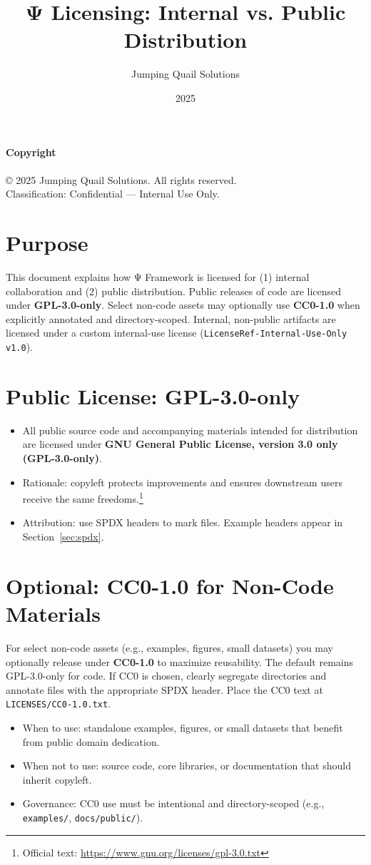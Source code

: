 \documentclass[11pt]{article}
\title{Ψ Licensing: Internal vs. Public Distribution}
\author{Jumping Quail Solutions}
\date{2025}
\newcommand{\proj}{Ψ Framework}
\begin{document}
\maketitle

\noindent\textbf{Copyright} \\[-0.3em]
\\© 2025 Jumping Quail Solutions. All rights reserved.\\
Classification: Confidential — Internal Use Only.\\

\section*{Purpose}
This document explains how \proj{} is licensed for (1) internal collaboration and (2) public distribution. Public releases of code are licensed under \textbf{GPL-3.0-only}. Select non-code assets may optionally use \textbf{CC0-1.0} when explicitly annotated and directory-scoped. Internal, non-public artifacts are licensed under a custom internal-use license (\texttt{LicenseRef-Internal-Use-Only v1.0}).

\section*{Public License: GPL-3.0-only}
\begin{itemize}[leftmargin=*]
  \item All public source code and accompanying materials intended for distribution are licensed under \textbf{GNU General Public License, version 3.0 only (GPL-3.0-only)}.
  \item Rationale: copyleft protects improvements and ensures downstream users receive the same freedoms.\footnote{Official text: \url{https://www.gnu.org/licenses/gpl-3.0.txt}}
  \item Attribution: use SPDX headers to mark files. Example headers appear in Section~\ref{sec:spdx}.
\end{itemize}

\section*{Optional: CC0-1.0 for Non-Code Materials}
For select non-code assets (e.g., examples, figures, small datasets) you may optionally release under \textbf{CC0-1.0} to maximize reusability. The default remains GPL-3.0-only for code. If CC0 is chosen, clearly segregate directories and annotate files with the appropriate SPDX header. Place the CC0 text at \texttt{LICENSES/CC0-1.0.txt}.
\begin{itemize}[leftmargin=*]
  \item When to use: standalone examples, figures, or small datasets that benefit from public domain dedication.
  \item When not to use: source code, core libraries, or documentation that should inherit copyleft.
  \item Governance: CC0 use must be intentional and directory-scoped (e.g., \texttt{examples/}, \texttt{docs/public/}).
\end{itemize}
\end{document}
